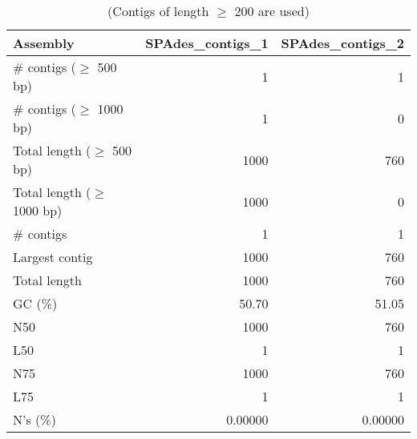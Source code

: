 \begin{table}[ht]
\begin{center}
\caption{(Contigs of length $\geq$ 200 are used)}
\begin{tabular}{|l*{2}{|r}|}
\hline
Assembly & SPAdes\_contigs\_1 & SPAdes\_contigs\_2 \\ \hline
\# contigs ($\geq$ 500 bp) & 1 & 1 \\ \hline
\# contigs ($\geq$ 1000 bp) & 1 & 0 \\ \hline
Total length ($\geq$ 500 bp) & 1000 & 760 \\ \hline
Total length ($\geq$ 1000 bp) & 1000 & 0 \\ \hline
\# contigs & 1 & 1 \\ \hline
Largest contig & 1000 & 760 \\ \hline
Total length & 1000 & 760 \\ \hline
GC (\%) & 50.70 & 51.05 \\ \hline
N50 & 1000 & 760 \\ \hline
L50 & 1 & 1 \\ \hline
N75 & 1000 & 760 \\ \hline
L75 & 1 & 1 \\ \hline
N's (\%) & 0.00000 & 0.00000 \\ \hline
\end{tabular}
\end{center}
\end{table}
